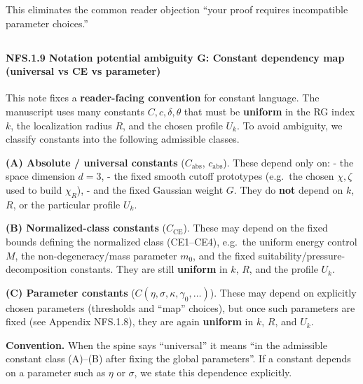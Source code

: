 \documentclass[
  11pt,
]{article}
\begin{document}
This eliminates the common reader objection ``your proof requires incompatible parameter choices.''

\hypertarget{section}{%
\subsection{}\label{section}}

\hypertarget{nfs.1.9-notation-potential-ambiguity-g-constant-dependency-map-universal-vs-ce-vs-parameter}{%
\paragraph{NFS.1.9 Notation potential ambiguity G: Constant dependency map (universal vs CE vs parameter)}\label{nfs.1.9-notation-potential-ambiguity-g-constant-dependency-map-universal-vs-ce-vs-parameter}}

This note fixes a \textbf{reader-facing convention} for constant language. The manuscript uses many constants \(C,c,\delta,\theta\) that must be \textbf{uniform} in the RG index \(k\), the localization radius \(R\), and the chosen profile \(U_k\). To avoid ambiguity, we classify constants into the following admissible classes.

\textbf{(A) Absolute / universal constants} (\(C_{\mathrm{abs}}\), \(c_{\mathrm{abs}}\)). These depend only on: - the space dimension \(d=3\), - the fixed smooth cutoff prototypes (e.g.~the chosen \(\chi,\zeta\) used to build \(\chi_R\)), - and the fixed Gaussian weight \(G\). They do \textbf{not} depend on \(k\), \(R\), or the particular profile \(U_k\).

\textbf{(B) Normalized-class constants} (\(C_{\mathrm{CE}}\)). These may depend on the fixed bounds defining the normalized class (CE1--CE4), e.g.~the uniform energy control \(M\), the non-degeneracy/mass parameter \(m_0\), and the fixed suitability/pressure-decomposition constants. They are still \textbf{uniform} in \(k\), \(R\), and the profile \(U_k\).

\textbf{(C) Parameter constants} (\(C(\eta,\sigma,\kappa,\gamma_0,\dots)\)). These may depend on explicitly chosen parameters (thresholds and ``map'' choices), but once such parameters are fixed (see Appendix NFS.1.8), they are again \textbf{uniform} in \(k\), \(R\), and \(U_k\).

\textbf{Convention.} When the spine says ``universal'' it means ``in the admissible constant class (A)--(B) after fixing the global parameters''. If a constant depends on a parameter such as \(\eta\) or \(\sigma\), we state this dependence explicitly.
\end{document}
